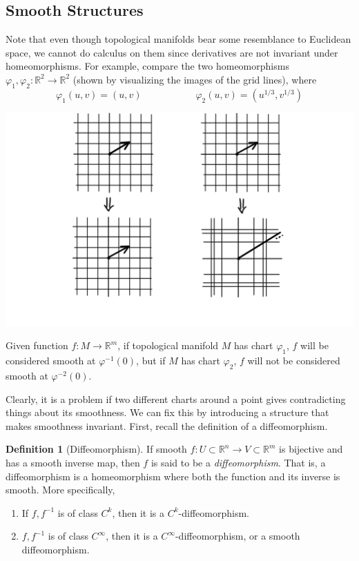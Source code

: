 \documentclass{article}
\theoremstyle{remark}
\theoremstyle{definition}
\newtheorem{definition}{Definition}[section]
\begin{document}
\subsection{Smooth Structures}
Note that even though topological manifolds bear some resemblance to Euclidean space, we cannot do calculus on them since derivatives are not invariant under homeomorphisms. For example, compare the two homeomorphisms $\varphi_1, \varphi_2: \mathbb{R}^2 \longrightarrow \mathbb{R}^2$ (shown by visualizing the images of the grid lines), where
\[\varphi_1 (u, v) = (u, v) \;\;\;\;\;\;\;\;\;\;\;\;\;\;\;\;\;\;\;\; \varphi_2 (u, v) = (u^{1/3}, v^{1/3})\]
\begin{center}
    \includegraphics[scale=0.22]{img/Nonexistent_Derivative_Homeomorphism.PNG}
\end{center}
Given function $f: M \longrightarrow \mathbb{R}^m$, if topological manifold $M$ has chart $\varphi_1$, $f$ will be considered smooth at $\varphi^{-1}(0)$, but if $M$ has chart $\varphi_2$, $f$ will not be considered smooth at $\varphi^{-2}(0)$. 

Clearly, it is a problem if two different charts around a point gives contradicting things about its smoothness. We can fix this by introducing a structure that makes smoothness invariant. First, recall the definition of a diffeomorphism. 

\begin{definition}[Diffeomorphism]
If smooth $f: U \subset \mathbb{R}^n \longrightarrow V \subset \mathbb{R}^m$ is bijective and has a smooth inverse map, then $f$ is said to be a \textit{diffeomorphism}. That is, a diffeomorphism is a homeomorphism where both the function and its inverse is smooth. More specifically, 
\begin{enumerate}
    \item If $f, f^{-1}$ is of class $C^k$, then it is a $C^k$-diffeomorphism. 
    \item $f, f^{-1}$ is of class $C^\infty$, then it is a $C^\infty$-diffeomorphism, or a smooth diffeomorphism.
\end{enumerate}
\end{definition}
\end{document}
